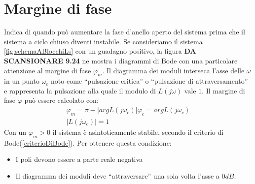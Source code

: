 \documentclass[a4paper]{report}
\newcommand{\bo}{\bfseries }
\begin{document}
\section{Margine di fase}
Indica di quando pu\`o aumentare la fase d'anello aperto del sistema
prima che il sistema a ciclo chiuso diventi instabile.
Se consideriamo il sistema \ref{fig:schemaABlocchiLs} con un guadagno
positivo, la figura {\bo DA SCANSIONARE 9.24} ne mostra i diagrammi di
Bode con una particolare attenzione al margine di fase $\varphi_m$. Il
diagramma dei moduli interseca l'asse delle $\omega$ in un punto
$\omega_c$ noto come ``pulsazione critica'' o ``pulsazione di attraversamento'' e rappresenta la pulsazione alla quale il modulo di
$L(j \omega)$ vale $1$. Il margine di fase $\varphi$ pu\`o essere
calcolato con:
\[
\begin{array}{l}
  \varphi_m = \pi - |arg L(j \omega_c)|
  \varphi_c = arg L(j \omega_c)\\
  |L(j \omega_c)| = 1
\end{array}
\]
Con un $\varphi_m > 0$ il sistema \`e asintoticamente stabile, secondo
il criterio di Bode(\ref{criterioDiBode}). Per ottenere questa
condizione: 
\begin{itemize}
\item I poli devono essere a parte reale negativa
\item Il diagramma dei moduli deve ``attraversare'' una sola volta
  l'asse a $0 dB$.
\end{itemize}
\end{document}

